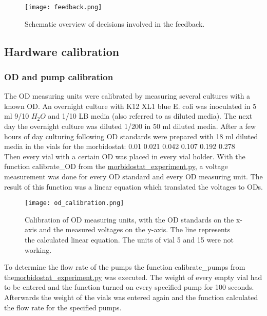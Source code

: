 \begin{figure}
	\texttt{[image: feedback.png]}
	\caption{Schematic overview of decisions involved in the feedback.}
	\label{figure:feedback}
\end{figure}

\subsection{Hardware calibration}
\subsubsection{OD and pump calibration}
The OD measuring units were calibrated by measuring several cultures with a known OD.
An overnight culture with K12 XL1 blue E. coli was inoculated in 5 ml 9/10 $H_2O$ and 1/10 LB media (also referred to as diluted media). The next day the overnight culture was diluted 1/200 in 50 ml diluted media. After a few hours of day culturing following OD standards were prepared with 18 ml diluted media in the vials for the morbidostat: 0.01 0.021 0.042 0.107 0.192 0.278\\
Then every vial with a certain OD was placed in every vial holder. With the function calibrate\_OD from the \href{https://github.com/nahanoo/ESBL\_project/}{morbidostat\_experiment.py}, a voltage measurement was done for every OD standard and every OD measuring unit. The result of this function was a linear equation which translated the voltages to ODs. \\
\begin{figure}[H]
	\texttt{[image: od\_calibration.png]}
	\caption{Calibration of OD measuring units, with the OD standards on the x-axis and the measured voltages on the y-axis. The line represents the calculated linear equation. The units of vial 5 and 15 were not working.}
\end{figure}
To determine the flow rate of the pumps the function calibrate\_pumps from the\href{https://github.com/nahanoo/ESBL\_project/}{morbidostat\_experiment.py} was executed. The weight of every empty vial had to be entered and the function turned on every specified pump for 100 seconds. Afterwards the weight of the vials was entered again and the function calculated the flow rate for the specified pumps. 
\label{section:OD_calibration}

